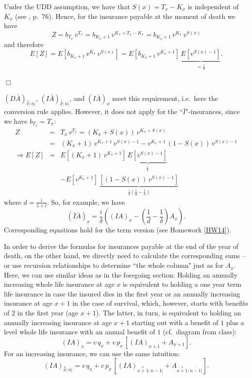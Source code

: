 \documentclass[11pt,fleqn,oneside]{book}
\begin{document}
Under the UDD assumption, we have that $S(x) = T_x-K_x$ is independent of $K_x$ (see \cite{BOWERS}, p.\ 76). Hence, for the insurance payable at the moment of death we have
$$
Z = b_{T_x}\,v^{T_x} = b_{K_x+1}\,v^{K_x + T_x - K_x} =  b_{K_x+1}\,v^{K_x}\,v^{S(x)} 
$$
and therefore
$$
E[Z] = E[b_{K_x+1}\,v^{K_x}\,v^{S(x)} ] = E[b_{K_x+1}\,v^{K_x+1}]\,\underbrace{E[v^{S(x)-1}]}_{=\frac{i}{\delta}}. 
$$
\begin{flushright}
{$\Box$}
\end{flushright}

${\left(D\bar{A}\right)_{\stackrel{1}{x}:\overline{n}|}}$, ${\left(I\bar{A}\right)_{\stackrel{1}{x}:\overline{n}|}}$, and ${\left(I\bar{A}\right)_{x}}$ meet this requirement, i.e.\ here the conversion rule applies. However, it does not apply for the ``$\bar{I}$"-insurances, since we have $b_{T_x}=T_x$:
\begin{eqnarray*}
Z &=& T_x\,v^{T_x} = (K_x+S(x))\,v^{K_x + S(x)} \\
&=& (K_x+1)\,v^{K_x+1}\,v^{S(x)-1} - v^{K_x+1}\,(1-S(x))\,v^{S(x)-1}\\
\Rightarrow E[Z] &=&  E\left[(K_x+1)\,v^{K_x+1}\right]\,\underbrace{E\left[v^{S(x)-1}\right]}_{\frac{i}{\delta}} \\
&& - E\left[v^{K_x+1}\right]\,\underbrace{\left[(1-S(x))\,v^{S(x)-1}\right]}_{\frac{i}{\delta}(\frac{1}{d} - \frac{1}{\delta})}
\end{eqnarray*}
where $d = \frac{i}{1+i}$. So, for example, we have
$$
\left(\bar{I}\bar{A}\right)_x = \frac{i}{\delta}\left(\left(IA\right)_x - \left(\frac{1}{d} - \frac{1}{\delta}\right) {A_x} \right).
$$
Corresponding equations hold for the term version (see Homework \ref{HW14}).
  
In order to derive the formulas for insurances payable at the end of the year of death, on the other hand, we directly need to calculate the corresponding sums -- or use recursion relationships to determine ``the whole column" just as for $A_x$. Here, we can use similar ideas as in the foregoing section: Holding an annually increasing whole life insurance at age $x$ is equivalent to holding a one year term life insurance in case the insured dies in the first year or an annually increasing insurance at age $x+1$ in the case of survival, which, however, starts with benefits of $2$ in the first year (age $x+1$). The latter, in turn, is equivalent to holding an annually increasing insurance at age $x+1$ starting out  with a benefit of $1$ plus a level whole life insurance with an annual benefit of $1$ (cf.\ diagram from class):
$$
\left(IA\right)_x = v\,q_x + v\,p_x\,\left[\left(IA\right)_{x+1} + {A_{x+1}}\right].
$$
For an increasing insurance, we can use the same intuition:
$$
{\left(IA\right)_{\stackrel{1}{x}:\overline{n}|}} = v\,q_x + v\,p_x\,\left[{\left(IA\right)_{\stackrel{1}{x+1}:\overline{n-1}|}} + {A_{\stackrel{1}{x+1}:\overline{n-1}|}}\right].
$$
\end{document}
